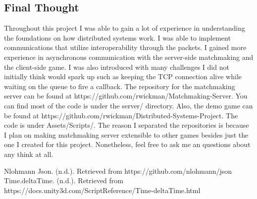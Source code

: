 \documentclass[conference]{IEEEtran}
\begin{document}
\subsection{Final Thought}
Throughout this project I was able to gain a lot of experience in understanding the foundations on how distributed systems work.
I was able to implement communications that utilize interoperability through the packets.
I gained more experience in asynchronous communication with the server-side matchmaking and the client-side game.
I was also introduced with many challenges I did not initially think would spark up such as  keeping the TCP connection alive while waiting on the queue to fire a callback.
The repository for the matchmaking server can be found at https://github.com/rwickman/Matchmaking-Server.
You can find most of the code is under the server/ directory.
Also, the demo game can be found at https://github.com/rwickman/Distributed-Systems-Project.
The code is under Assets/Scripts/.
The reason I separated the repositories is because I plan on making matchmaking server extensible to other games besides just the one I created for this project.
Nonetheless, feel free to ask me an questions about any think at all.



\begin{thebibliography}{00}
 Nlohmann Json. (n.d.). Retrieved from https://github.com/nlohmann/json
 Time.deltaTime. (n.d.). Retrieved from https://docs.unity3d.com/ScriptReference/Time-deltaTime.html 
\end{thebibliography}
\vspace{12pt}
\end{document}
